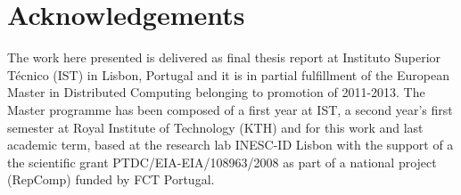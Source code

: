 \newpage



\chapter*{Acknowledgements}
\thispagestyle{empty}

The work here presented is delivered as final thesis report at Instituto Superior Técnico (IST) in Lisbon, Portugal and it is in partial fulfillment of the European Master in Distributed Computing belonging to promotion of 2011-2013. The Master programme has been composed of a first year at IST, a second year's first semester at Royal Institute of Technology (KTH) and for this work and last academic term, based at the research lab INESC-ID Lisbon with the support of a the scientific grant PTDC/EIA-EIA/108963/2008 as part of a national project (RepComp) funded by FCT Portugal.


